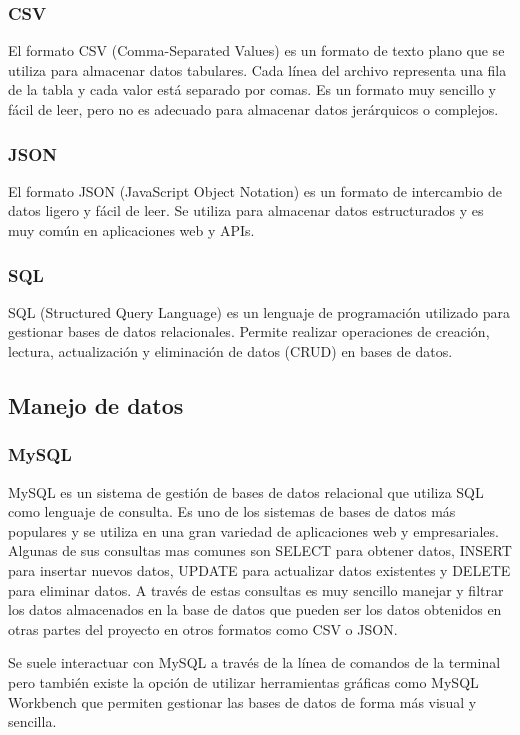 \subsubsection{CSV}

El formato CSV (Comma-Separated Values) es un formato de texto plano que se utiliza para almacenar datos tabulares.
Cada línea del archivo representa una fila de la tabla y cada valor está separado por comas.
Es un formato muy sencillo y fácil de leer, pero no es adecuado para almacenar datos jerárquicos o complejos.

\subsubsection{JSON}
El formato JSON (JavaScript Object Notation) es un formato de intercambio de datos ligero y fácil de leer.
Se utiliza para almacenar datos estructurados y es muy común en aplicaciones web y APIs.

\subsubsection{SQL}
SQL (Structured Query Language) es un lenguaje de programación utilizado para gestionar bases de datos relacionales.
Permite realizar operaciones de creación, lectura, actualización y eliminación de datos (CRUD) en bases de datos.

\subsection{Manejo de datos}

\subsubsection{MySQL}

MySQL es un sistema de gestión de bases de datos relacional que utiliza SQL como lenguaje de consulta.
Es uno de los sistemas de bases de datos más populares y se utiliza en una gran variedad de aplicaciones web y empresariales.
Algunas de sus consultas mas comunes son SELECT para obtener datos, INSERT para insertar nuevos datos, UPDATE para actualizar datos existentes y DELETE para eliminar datos.
A través de estas consultas es muy sencillo manejar y filtrar los datos almacenados en la base de datos que pueden ser los datos obtenidos en otras partes del proyecto en otros formatos como CSV o JSON.

Se suele interactuar con MySQL a través de la línea de comandos de la terminal pero también existe la opción de utilizar herramientas gráficas como MySQL Workbench que permiten gestionar las bases de datos de forma más visual y sencilla.